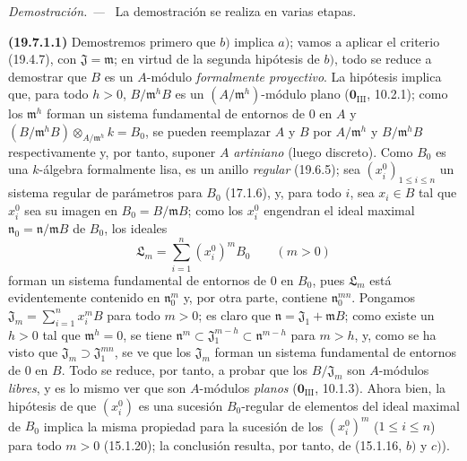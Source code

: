 \documentclass[10pt,oneside]{book}
\newenvironment{proof}{%
  \par\medskip\noindent\textit{Demostración. ---\ }}{\par}
\begin{document}
\begin{proof}
La demostración se realiza en varias etapas.

\medskip
\noindent{}\label{0.19.7.1.1-es}\textbf{(19.7.1.1)}\enspace
Demostremos primero que $b)$ implica $a)$; vamos a aplicar el criterio
(19.4.7), con $\mathfrak J=\mathfrak m$; en virtud de la segunda hipótesis
de $b)$, todo se reduce a demostrar que $B$ es un $A$-módulo
\emph{formalmente proyectivo}. La hipótesis implica que, para todo $h>0$,
$B/\mathfrak m^hB$ es un $(A/\mathfrak m^h)$-módulo plano
($\mathbf 0_{\mathrm{III}}$, 10.2.1); como los $\mathfrak m^h$ forman un
sistema fundamental de entornos de 0 en $A$ y
$(B/\mathfrak m^hB)\otimes_{A/\mathfrak m^h}k=B_0$, se pueden reemplazar $A$ y
$B$ por $A/\mathfrak m^h$ y $B/\mathfrak m^hB$ respectivamente y, por tanto,
suponer $A$ \emph{artiniano} (luego discreto). Como $B_0$ es una $k$-álgebra
formalmente lisa, es un anillo \emph{regular} (19.6.5); sea
$(x_i^0)_{1\leq i\leq n}$ un sistema regular de parámetros para $B_0$
(17.1.6), y, para todo $i$, sea $x_i\in B$ tal que $x_i^0$ sea su imagen
en $B_0=B/\mathfrak mB$; como los $x_i^0$ engendran el ideal maximal
$\mathfrak n_0=\mathfrak n/\mathfrak mB$ de $B_0$, los ideales
\[
  \mathfrak L_m=\sum_{i=1}^n(x_i^0)^mB_0 \qquad (m>0)
\]
forman un sistema fundamental de entornos de 0 en $B_0$, pues
$\mathfrak L_m$ está evidentemente contenido en $\mathfrak n_0^m$ y, por otra
parte, contiene $\mathfrak n_0^{mn}$. Pongamos
$\mathfrak J_m=\sum_{i=1}^n x_i^mB$ para todo $m>0$; es claro que
$\mathfrak n=\mathfrak J_1+\mathfrak mB$; como existe un $h>0$ tal que
$\mathfrak m^h=0$, se tiene
$\mathfrak n^m\subset\mathfrak J_1^{m-h}\subset\mathfrak n^{m-h}$ para
$m>h$, y, como se ha visto que $\mathfrak J_m\supset\mathfrak J_1^{mn}$, se ve
que los $\mathfrak J_m$ forman un sistema fundamental de entornos de 0 en
$B$. Todo se reduce, por tanto, a probar que los $B/\mathfrak J_m$ son
$A$-módulos \emph{libres}, y es lo mismo ver que son
$A$-módulos \emph{planos} ($\mathbf 0_{\mathrm{III}}$, 10.1.3). Ahora bien,
la hipótesis de que $(x_i^0)$ es una sucesión $B_0$-regular de elementos del ideal
maximal de $B_0$ implica la misma propiedad para la sucesión de los $(x_i^0)^m$
($1\leq i\leq n$) para todo $m>0$ (15.1.20); la conclusión resulta, por tanto, de
(15.1.16, $b)$ y $c)$).
\end{proof}
\end{document}
